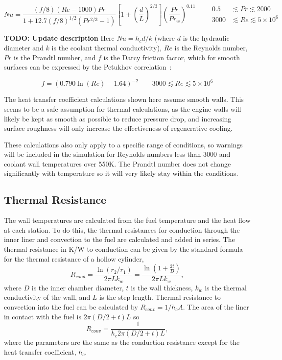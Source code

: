 \documentclass[11pt]{article}
\begin{document}
\begin{equation}
  Nu = \frac{(f/8)(Re - 1000)Pr}{1 + 12.7(f/8)^{1/2}(Pr^{2/3} - 1)} \left[ 1 + \left( \frac{d}{L} \right)^{2/3} \right] \left( \frac{Pr}{Pr_w} \right)^{0.11}
  \qquad
  \begin{aligned}
    0.5 & \lesssim Pr \lesssim 2000 \\
    3000 & \lesssim Re \lesssim 5 \times 10^6
  \end{aligned}
\end{equation}

\textbf{TODO: Update description} Here $Nu = h_c d / k$ (where $d$ is the hydraulic diameter and $k$ is the coolant thermal conductivity), $Re$ is the Reynolds number, $Pr$ is the Prandtl number, and $f$ is the Darcy friction factor, which for smooth surfaces can be expressed by the Petukhov correlation~\cite{bergman_fundamentals_2017}:

\begin{equation}
  f = (0.790 \ln (Re) - 1.64)^{-2} \qquad 3000 \lesssim Re \lesssim 5 \times 10^6
\end{equation}

The heat transfer coefficient calculations shown here assume smooth walls. This seems to be a safe assumption for thermal calculations, as the engine walls will likely be kept as smooth as possible to reduce pressure drop, and increasing surface roughness will only increase the effectiveness of regenerative cooling.

These calculations also only apply to a specific range of conditions, so warnings will be included in the simulation for Reynolds numbers less than 3000 and coolant wall temperatures over 550K. The Prandtl number does not change significantly with temperature so it will very likely stay within the conditions.

\subsection{Thermal Resistance}
The wall temperatures are calculated from the fuel temperature and the heat flow at each station. To do this, the thermal resistances for conduction through the inner liner and convection to the fuel are calculated and added in series. The thermal resistance in K/W to conduction can be given by the standard formula for the thermal resistance of a hollow cylinder,
\begin{equation}
    R_{cond} = \frac{\ln{\left(r_2 / r_1\right)}}{2 \pi L k_w} = \frac{\ln{\left( 1 + \frac{2t}{D}\right)}}{2 \pi L k_w},
\end{equation}
where $D$ is the inner chamber diameter, $t$ is the wall thickness, $k_w$ is the thermal conductivity of the wall, and $L$ is the step length. Thermal resistance to convection into the fuel can be calculated by $R_{conv} = 1 / h_c A$. The area of the liner in contact with the fuel is $2 \pi (D / 2 + t) L $ so
\begin{equation}
    R_{conv} = \frac{1}{h_c 2 \pi (D/2 + t) L},
\end{equation}
where the parameters are the same as the conduction resistance except for the heat transfer coefficient, $h_c$.
\end{document}
